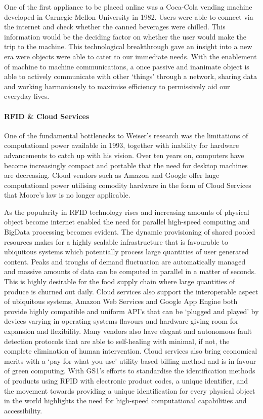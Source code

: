 \documentclass[a4paper, 11pt]{article}
\begin{document}
One of the first appliance to be placed online was a Coca-Cola vending machine developed in Carnegie Mellon University in 1982. Users were able to connect via the internet and check whether the canned beverages were chilled. This information would be the deciding factor on whether the user would make the trip to the machine. This technological breakthrough gave an insight into a new era were objects were able to cater to our immediate needs. With the enablement of machine to machine communications, a once passive and inanimate object is able to actively communicate with other `things' through a network, sharing data and working harmoniously to maximise efficiency to permissively aid our everyday lives.

\paragraph{RFID \& Cloud Services}One of the fundamental bottlenecks to Weiser's research was the limitations of computational power available in 1993\cite{weiserLimit}, together with inability for hardware advancements to catch up with his vision. Over ten years on, computers have become increasingly compact and portable that the need for desktop machines are decreasing. Cloud vendors such as Amazon and Google offer huge computational power utilising comodity hardware in the form of Cloud Services that Moore's law is no longer applicable\cite{HadoopInAction}. 

As the popularity in RFID technology rises and increasing amounts of physical object become internet enabled the need for parallel high-speed computing and BigData processing becomes evident. The dynamic provisioning of shared pooled resources makes for a highly scalable infrastructure that is favourable to ubiquitous systems which potentially process large quantities of user generated content. Peaks and troughs of demand fluctuation are automatically managed and massive amounts of data can be computed in parallel in a matter of seconds. This is highly desirable for the food supply chain where large quantities of produce is churned out daily. Cloud services also support the interoperable aspect of ubiquitous systems, Amazon Web Services and Google App Engine both provide highly compatible and uniform API's that can be `plugged and played' by devices varying in operating systems flavours and hardware giving room for expansion and flexibility. Many vendors also have elegant and autonomous fault detection protocols that are able to self-healing with minimal, if not, the complete elimination of human intervention. Cloud services also bring economical merits with a `pay-for-what-you-use' utility based billing method and is in favour of green computing. With GS1's efforts to standardise the identification methods of products using RFID with electronic product codes, a unique identifier, and the movement towards providing a unique identification for every physical object in the world highlights the need for high-speed computational capabilities and accessibility. 
\end{document}
